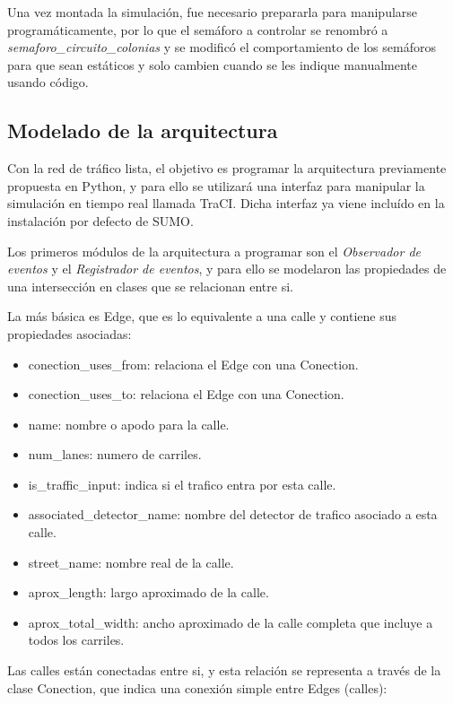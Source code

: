 Una vez montada la simulación, fue necesario prepararla para manipularse
programáticamente, por lo que el semáforo a controlar se renombró a
\emph{semaforo\_circuito\_colonias} y se modificó el comportamiento de
los semáforos para que sean estáticos y solo cambien cuando se les
indique manualmente usando código.

\hypertarget{modelado-de-la-arquitectura}{%
\subsection{Modelado de la
arquitectura}\label{modelado-de-la-arquitectura}}

Con la red de tráfico lista, el objetivo es programar la arquitectura
previamente propuesta en Python, y para ello se utilizará una interfaz
para manipular la simulación en tiempo real llamada TraCI. Dicha
interfaz ya viene incluído en la instalación por defecto de SUMO.

Los primeros módulos de la arquitectura a programar son el
\emph{Observador de eventos} y el \emph{Registrador de eventos}, y para
ello se modelaron las propiedades de una intersección en clases que se
relacionan entre si.

La más básica es Edge, que es lo equivalente a una calle y contiene sus
propiedades asociadas:

\begin{itemize}
\tightlist
\item
  conection\_uses\_from: relaciona el Edge con una Conection.
\item
  conection\_uses\_to: relaciona el Edge con una Conection.
\item
  name: nombre o apodo para la calle.
\item
  num\_lanes: numero de carriles.
\item
  is\_traffic\_input: indica si el trafico entra por esta calle.
\item
  associated\_detector\_name: nombre del detector de trafico asociado a
  esta calle.
\item
  street\_name: nombre real de la calle.
\item
  aprox\_length: largo aproximado de la calle.
\item
  aprox\_total\_width: ancho aproximado de la calle completa que incluye
  a todos los carriles.
\end{itemize}

Las calles están conectadas entre si, y esta relación se representa a
través de la clase Conection, que indica una conexión simple entre Edges
(calles):

